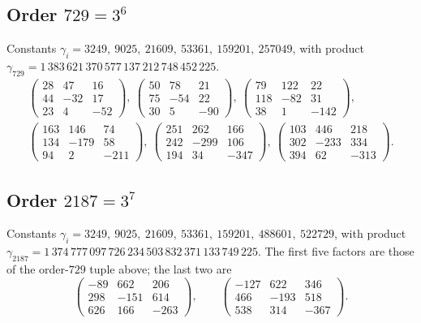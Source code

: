 \documentclass[11pt,a4paper]{amsart}
\theoremstyle{plain}
\theoremstyle{definition}
\theoremstyle{remark}
\begin{document}
\subsection*{Order $729=3^6$}
Constants $\gamma_i = 3249,\ 9025,\ 21609,\ 53361,\ 159201,\ 257049$, with
product $\gamma_{729}=1\,383\,621\,370\,577\,137\,212\,748\,452\,225$.
\[
\begin{gathered}
\begin{pmatrix}28&47&16\\44&-32&17\\23&4&-52\end{pmatrix}\!,\
\begin{pmatrix}50&78&21\\75&-54&22\\30&5&-90\end{pmatrix}\!,\
\begin{pmatrix}79&122&22\\118&-82&31\\38&1&-142\end{pmatrix}\!,\\[4pt]
\begin{pmatrix}163&146&74\\134&-179&58\\94&2&-211\end{pmatrix}\!,\
\begin{pmatrix}251&262&166\\242&-299&106\\194&34&-347\end{pmatrix}\!,\
\begin{pmatrix}103&446&218\\302&-233&334\\394&62&-313\end{pmatrix}\!.
\end{gathered}
\]

\subsection*{Order $2187=3^7$}
Constants $\gamma_i = 3249,\ 9025,\ 21609,\ 53361,\ 159201,\ 488601,\ 522729$,
with product
$\gamma_{2187}=1\,374\,777\,097\,726\,234\,503\,832\,371\,133\,749\,225$.
The first five factors are those of the order-$729$ tuple above; the last two
are
\[
\begin{pmatrix}-89&662&206\\298&-151&614\\626&166&-263\end{pmatrix}\!,
\qquad
\begin{pmatrix}-127&622&346\\466&-193&518\\538&314&-367\end{pmatrix}\!.
\]
\end{document}
